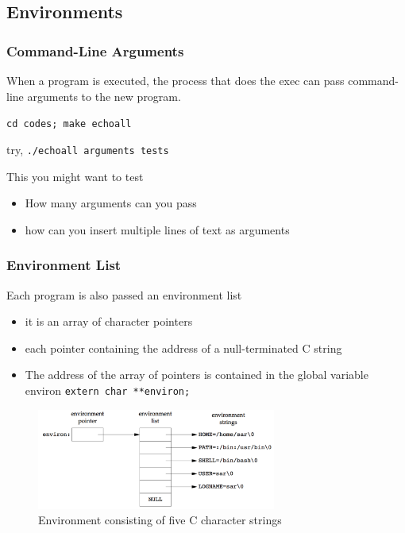 \documentclass[newPxFont,sthlmFooter,nooffset]{beamer}
\begin{document}
\subsection{Environments}

\begin{frame}
  \frametitle{Command-Line Arguments}
When a program is executed, the process that does the exec can pass command-line arguments to the new program.

\texttt{cd codes; make echoall}



try,
\texttt{./echoall arguments tests}

This you might want to test
\begin{itemize}
\item How many arguments can you pass
\item how can you insert multiple lines of text as arguments
\end{itemize}
\end{frame}

\begin{frame}[t]
  \frametitle{Environment List}
Each program is also passed an environment list
\begin{itemize}
\item it is an array of character pointers
\item each pointer containing the address of a null-terminated C
  string
\item The address of the array of pointers is contained in the global variable environ \texttt{extern char **environ;}
\end{itemize}

\begin{figure}[h]
  \centering
  \includegraphics[width=0.7\textwidth]{figure/fig7-5_environment.png}
  \caption{Environment consisting of five C character strings}
\end{figure}
\end{frame}
\end{document}
